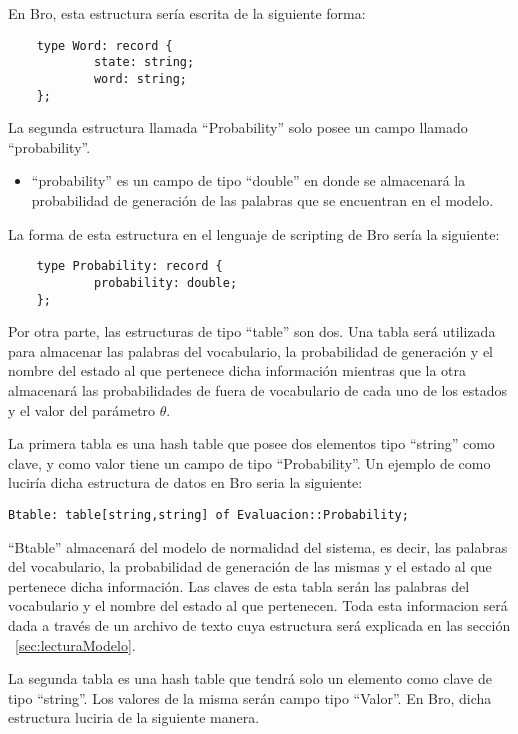 En Bro, esta estructura sería escrita de la siguiente forma:

\begin{verbatim}
    type Word: record {
            state: string;
            word: string;
    };
\end{verbatim}

La segunda estructura llamada “Probability” solo posee un campo llamado “probability”.

\begin{itemize}
\item “probability” es un campo de tipo “double” en donde se almacenará la probabilidad de generación de las palabras que se encuentran en el modelo.
\end{itemize}

La forma de esta estructura en el lenguaje de scripting de Bro sería la siguiente:
\begin{verbatim}
    type Probability: record {
            probability: double;
    };
\end{verbatim}

Por otra parte, las estructuras de tipo “table” son dos. Una tabla será utilizada para almacenar las palabras del vocabulario, la probabilidad de generación y el nombre del estado al que pertenece dicha información mientras que la otra almacenará las probabilidades de fuera de vocabulario de cada uno de los estados y el valor del parámetro $\theta$.

La primera tabla es una hash table que posee dos elementos tipo “string” como clave, y como valor tiene un campo de tipo “Probability”. Un ejemplo de como luciría dicha estructura de datos en Bro seria la siguiente:

\begin{verbatim}
Btable: table[string,string] of Evaluacion::Probability;
\end{verbatim}

“Btable” almacenará del modelo de normalidad del sistema, es decir, las palabras del vocabulario, la probabilidad de generación de las mismas y el estado al que pertenece dicha información. Las claves de esta tabla serán las palabras del vocabulario y el nombre del estado al que pertenecen. Toda esta informacion será dada a través de un archivo de texto cuya estructura será explicada en las sección ~\ref{sec:lecturaModelo}.

La segunda tabla es una hash table que tendrá solo un elemento como clave de tipo “string”. Los valores de la misma serán campo tipo “Valor”. En Bro, dicha estructura luciria de la siguiente manera.

